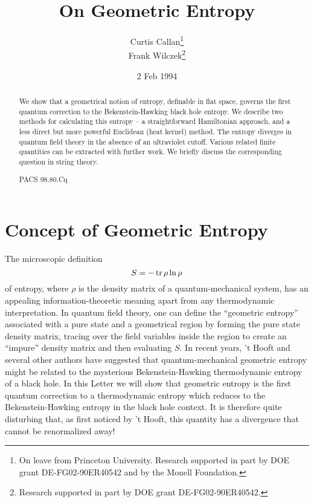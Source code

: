 \documentclass[12pt]{article}
\begin{document}
\title{On Geometric Entropy}
\date{2 Feb 1994}
\author{Curtis Callan\footnote{On leave from Princeton University. Research supported
in part by DOE grant DE-FG02-90ER40542 and by the Monell Foundation.
} \\ Frank Wilczek\footnote{Research supported in part by DOE
grant DE-FG02-90ER40542.}}

\maketitle

\begin{abstract}We show that a geometrical notion of entropy,
definable in flat space, governs the first quantum correction to
the Bekenstein-Hawking black hole entropy.  We describe two methods
for calculating this entropy -- a straightforward Hamiltonian approach,
and a less direct but more powerful Euclidean (heat kernel) method.
The entropy diverges in quantum field theory in the absence of an
ultraviolet cutoff. Various related finite quantities can be
extracted with further work.  We briefly discuss the corresponding
question in string theory.

PACS 98.80.Cq

\end{abstract}

\def\tr{\mathop{\rm tr}}

\section{Concept of Geometric Entropy}


The microscopic definition $$S=-\tr\rho \ln \rho$$ of entropy, where
$\rho$ is the density matrix of a quantum-mechanical system, has an appealing
information-theoretic meaning apart from any thermodynamic interpretation.
In quantum field theory, one can define the ``geometric entropy'' associated
with a pure state and a geometrical region by forming the pure state density
matrix, tracing over the field variables inside the region to create an
``impure'' density matrix and then evaluating $S$. In recent years, 't Hooft
\cite{tHooft} and several other authors \cite{Bombelli,Holzhey,Srednicki}
have suggested that quantum-mechanical geometric entropy might be related to
the mysterious Bekenstein-Hawking thermodynamic entropy of a black hole.
In this Letter we will show that geometric entropy is the first quantum
correction to a thermodynamic entropy which reduces to the Bekenstein-Hawking
entropy in the black hole context. It is therefore quite disturbing that,
as first noticed by 't Hooft, this quantity has a divergence that cannot be
renormalized away!
\end{document}
